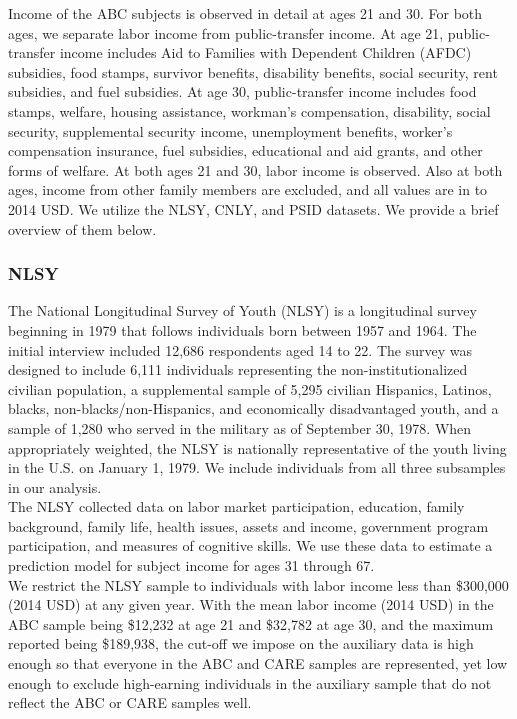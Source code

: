 \noindent Income of the ABC subjects is observed in detail at ages 21 and 30. For both ages,
we separate labor income from public-transfer income. At age 21, public-transfer income includes Aid to
Families with Dependent Children (AFDC) subsidies, food stamps, survivor benefits, disability
benefits, social security, rent subsidies, and fuel subsidies. At age 30, public-transfer income includes food stamps, welfare, housing assistance, workman's
compensation, disability, social security, supplemental security income, unemployment benefits,
worker's compensation insurance, fuel subsidies, educational and aid grants, and other forms of welfare.
At both ages 21 and 30, labor income is observed. Also at both ages, income from other family members are excluded, and all values are in
to 2014 USD. We utilize the
NLSY, CNLY, and PSID datasets. We provide a brief overview of them below. \\

\subsubsection{NLSY}
\label{app:subject_income_nlsy}

\noindent The National Longitudinal Survey of Youth (NLSY) is a longitudinal survey beginning in 1979
that follows individuals born between 1957 and 1964. The initial interview included
12,686 respondents aged 14 to 22. The survey was designed to include 6,111
individuals representing the non-institutionalized civilian population, a supplemental
sample of 5,295 civilian Hispanics, Latinos, blacks, non-blacks/non-Hispanics, and economically
disadvantaged youth, and a sample of 1,280 who served in the military as of September 30,
1978. When appropriately weighted, the NLSY is nationally representative of the youth
living in the U.S. on January 1, 1979. We include individuals from all three subsamples
in our analysis. \\

\noindent The NLSY collected data on labor market participation, education, family background,
family life, health issues, assets and income, government program participation, and
measures of cognitive skills. We use these data to estimate a prediction model for
subject income for ages 31 through 67. \\

\noindent We restrict the NLSY sample to individuals with labor income less than
\$300,000 (2014 USD) at any given year. With the mean labor income (2014 USD) in the ABC
sample being \$12,232 at age 21 and \$32,782 at age 30, and the maximum reported
being \$189,938, the cut-off we impose on the auxiliary data is high enough
so that everyone in the ABC  and CARE samples are represented, yet low enough to
exclude high-earning individuals in the auxiliary sample that do not reflect the ABC or CARE samples well. \\

